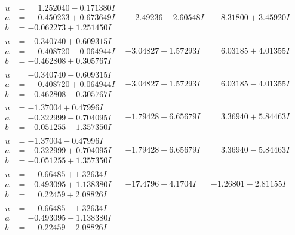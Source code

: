 \documentclass[1p]{elsarticle_modified}
\theoremstyle{definition}
\begin{document}
$$\begin{array}{c|c|c}
\begin{aligned}
u &= \phantom{-}1.252040 - 0.171380 I \\
a &= \phantom{-}0.450233 + 0.673649 I \\
b &= -0.062273 + 1.251450 I\end{aligned}
 & \phantom{-}2.49236 - 2.60548 I & \phantom{-}8.31800 + 3.45920 I \\ \hline\begin{aligned}
u &= -0.340740 + 0.609315 I \\
a &= \phantom{-}0.408720 - 0.064944 I \\
b &= -0.462808 + 0.305767 I\end{aligned}
 & -3.04827 - 1.57293 I & \phantom{-}6.03185 + 4.01355 I \\ \hline\begin{aligned}
u &= -0.340740 - 0.609315 I \\
a &= \phantom{-}0.408720 + 0.064944 I \\
b &= -0.462808 - 0.305767 I\end{aligned}
 & -3.04827 + 1.57293 I & \phantom{-}6.03185 - 4.01355 I \\ \hline\begin{aligned}
u &= -1.37004 + 0.47996 I \\
a &= -0.322999 - 0.704095 I \\
b &= -0.051255 - 1.357350 I\end{aligned}
 & -1.79428 - 6.65679 I & \phantom{-}3.36940 + 5.84463 I \\ \hline\begin{aligned}
u &= -1.37004 - 0.47996 I \\
a &= -0.322999 + 0.704095 I \\
b &= -0.051255 + 1.357350 I\end{aligned}
 & -1.79428 + 6.65679 I & \phantom{-}3.36940 - 5.84463 I \\ \hline\begin{aligned}
u &= \phantom{-}0.66485 + 1.32634 I \\
a &= -0.493095 + 1.138380 I \\
b &= \phantom{-}0.22459 + 2.08826 I\end{aligned}
 & -17.4796 + 4.1704 I & -1.26801 - 2.81155 I \\ \hline\begin{aligned}
u &= \phantom{-}0.66485 - 1.32634 I \\
a &= -0.493095 - 1.138380 I \\
b &= \phantom{-}0.22459 - 2.08826 I\end{aligned}

\end{array}$$
\end{document}
